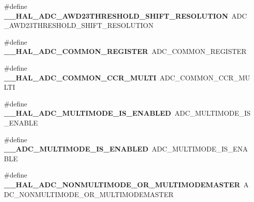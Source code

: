 \begin{DoxyCompactItemize}
\mbox{\label{group___h_a_l___a_d_c___aliased___macros_ga4038d6abc1b95e035a2a0b51fb999db2}} 
\#define {\bfseries \+\_\+\+\_\+\+H\+A\+L\+\_\+\+A\+D\+C\+\_\+\+A\+W\+D23\+T\+H\+R\+E\+S\+H\+O\+L\+D\+\_\+\+S\+H\+I\+F\+T\+\_\+\+R\+E\+S\+O\+L\+U\+T\+I\+ON}~A\+D\+C\+\_\+\+A\+W\+D23\+T\+H\+R\+E\+S\+H\+O\+L\+D\+\_\+\+S\+H\+I\+F\+T\+\_\+\+R\+E\+S\+O\+L\+U\+T\+I\+ON
\item 
\mbox{\label{group___h_a_l___a_d_c___aliased___macros_ga00ebbedf4015e4538720e7a6dbacce59}} 
\#define {\bfseries \+\_\+\+\_\+\+H\+A\+L\+\_\+\+A\+D\+C\+\_\+\+C\+O\+M\+M\+O\+N\+\_\+\+R\+E\+G\+I\+S\+T\+ER}~A\+D\+C\+\_\+\+C\+O\+M\+M\+O\+N\+\_\+\+R\+E\+G\+I\+S\+T\+ER
\item 
\mbox{\label{group___h_a_l___a_d_c___aliased___macros_ga8bf50f7c58849d4cd141a421d55b148d}} 
\#define {\bfseries \+\_\+\+\_\+\+H\+A\+L\+\_\+\+A\+D\+C\+\_\+\+C\+O\+M\+M\+O\+N\+\_\+\+C\+C\+R\+\_\+\+M\+U\+L\+TI}~A\+D\+C\+\_\+\+C\+O\+M\+M\+O\+N\+\_\+\+C\+C\+R\+\_\+\+M\+U\+L\+TI
\item 
\mbox{\label{group___h_a_l___a_d_c___aliased___macros_ga79f75f2e379c482c38441c050efc7225}} 
\#define {\bfseries \+\_\+\+\_\+\+H\+A\+L\+\_\+\+A\+D\+C\+\_\+\+M\+U\+L\+T\+I\+M\+O\+D\+E\+\_\+\+I\+S\+\_\+\+E\+N\+A\+B\+L\+ED}~A\+D\+C\+\_\+\+M\+U\+L\+T\+I\+M\+O\+D\+E\+\_\+\+I\+S\+\_\+\+E\+N\+A\+B\+LE
\item 
\mbox{\label{group___h_a_l___a_d_c___aliased___macros_gaa5b9fcac48711d597023aecdb11afc51}} 
\#define {\bfseries \+\_\+\+\_\+\+A\+D\+C\+\_\+\+M\+U\+L\+T\+I\+M\+O\+D\+E\+\_\+\+I\+S\+\_\+\+E\+N\+A\+B\+L\+ED}~A\+D\+C\+\_\+\+M\+U\+L\+T\+I\+M\+O\+D\+E\+\_\+\+I\+S\+\_\+\+E\+N\+A\+B\+LE
\item 
\mbox{\label{group___h_a_l___a_d_c___aliased___macros_ga3dceabcf80e81b5a911bbe5ad3ff311a}} 
\#define {\bfseries \+\_\+\+\_\+\+H\+A\+L\+\_\+\+A\+D\+C\+\_\+\+N\+O\+N\+M\+U\+L\+T\+I\+M\+O\+D\+E\+\_\+\+O\+R\+\_\+\+M\+U\+L\+T\+I\+M\+O\+D\+E\+M\+A\+S\+T\+ER}~A\+D\+C\+\_\+\+N\+O\+N\+M\+U\+L\+T\+I\+M\+O\+D\+E\+\_\+\+O\+R\+\_\+\+M\+U\+L\+T\+I\+M\+O\+D\+E\+M\+A\+S\+T\+ER

\end{DoxyCompactItemize}
